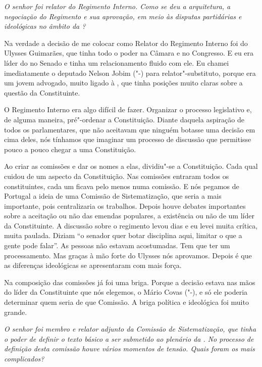 \medskip

\emph{O senhor foi relator do Regimento Interno. Como se deu a
arquitetura, a negociação do Regimento e sua aprovação, em meio às
disputas partidárias e ideológicas no âmbito da ?}

Na verdade a decisão de me colocar como Relator do
Regimento Interno foi do Ulysses Guimarães, que tinha todo o poder na
Câmara e no Congresso. E eu era líder do  no Senado e tinha um
relacionamento fluido com ele. Eu chamei imediatamente o deputado Nelson
Jobim ("-) para relator"-substituto, porque era um jovem advogado,
muito ligado à , que tinha posições muito claras sobre a questão da
Constituinte.

O Regimento Interno era algo difícil de fazer. Organizar o processo
legislativo e, de alguma maneira, pré"-ordenar a Constituição. Diante
daquela aspiração de todos os parlamentares, que não aceitavam que
ninguém botasse uma decisão em cima deles, nós tínhamos que imaginar um
processo de discussão que permitisse pouco a pouco chegar a uma
Constituição.

Ao criar as comissões e dar os nomes a elas, dividiu"-se a Constituição.
Cada qual cuidou de um aspecto da Constituição. Nas comissões entraram
todos os constituintes, cada um ficava pelo menos numa comissão. E nós
pegamos de Portugal a ideia de uma Comissão de Sistematização, que seria
a mais importante, pois centralizaria os trabalhos. Depois houve debates
importantes sobre a aceitação ou não das emendas populares, a existência
ou não de um líder da Constituinte. A discussão sobre o regimento levou
dias e eu levei muita crítica, muita paulada. Diziam ``o senador quer
botar disciplina aqui, limitar o que a gente pode falar''. As pessoas
não estavam acostumadas. Tem que ter um processamento. Mas graças à mão
forte do Ulysses nós aprovamos. Depois é que as diferenças ideológicas
se apresentaram com mais força.

Na composição das comissões já foi uma briga. Porque a decisão estava
nas mãos do líder da Constituinte que nós elegemos, o Mário Covas
("-), e só ele poderia determinar quem seria de que Comissão. A
briga política e ideológica foi muito grande.

\medskip

\emph{O senhor foi membro e relator adjunto da Comissão de
Sistematização, que tinha o poder de definir o texto básico a ser
submetido ao plenário da . No processo de definição desta comissão
houve vários momentos de tensão. Quais foram os mais complicados?}

